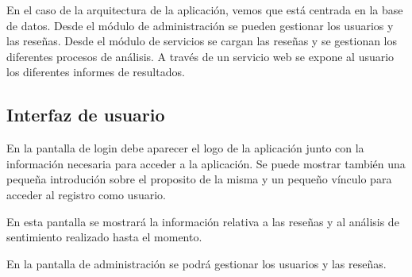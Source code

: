 En el caso de la arquitectura de la aplicación, vemos que está centrada en la base de datos.
Desde el módulo de administración se pueden gestionar los usuarios y las reseñas.
Desde el módulo de servicios se cargan las reseñas y se gestionan los diferentes procesos de análisis.
A través de un servicio web se expone al usuario los diferentes informes de resultados.


\subsection{Interfaz de usuario}
En la pantalla de login debe aparecer el logo de la aplicación 
junto con la información necesaria para acceder a la aplicación.
Se puede mostrar también una pequeña introdución sobre el proposito de la misma y 
un pequeño vínculo para acceder al registro como usuario.

En esta pantalla se mostrará la información relativa a las reseñas y al análisis de sentimiento realizado hasta el momento.


En la pantalla de administración se podrá gestionar los usuarios y las reseñas.

